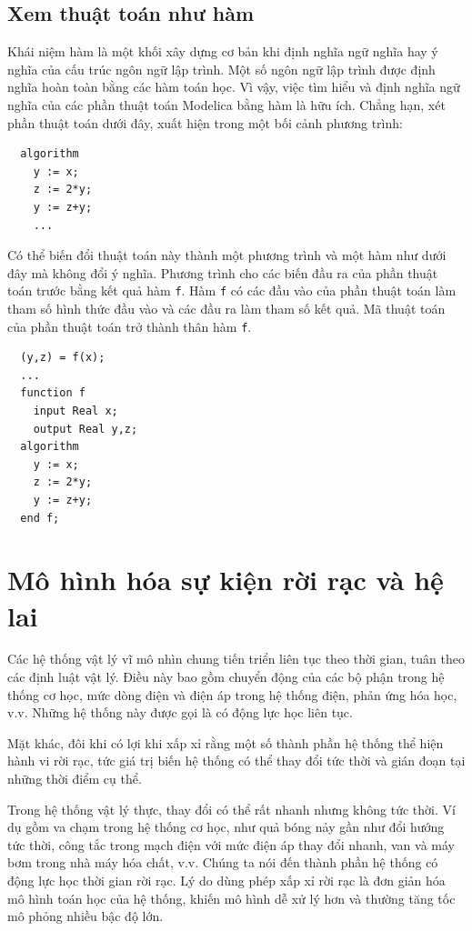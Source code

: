 \subsection{Xem thuật toán như hàm}
Khái niệm hàm là một khối xây dựng cơ bản khi định nghĩa ngữ nghĩa hay ý nghĩa của cấu trúc ngôn ngữ lập trình. Một số ngôn ngữ lập trình được định nghĩa hoàn toàn bằng các hàm toán học. Vì vậy, việc tìm hiểu và định nghĩa ngữ nghĩa của các phần thuật toán Modelica bằng hàm là hữu ích. Chẳng hạn, xét phần thuật toán dưới đây, xuất hiện trong một bối cảnh phương trình:
\begin{verbatim}
  algorithm
    y := x;
    z := 2*y;
    y := z+y;
    ...
\end{verbatim}
Có thể biến đổi thuật toán này thành một phương trình và một hàm như dưới đây mà không đổi ý nghĩa. Phương trình cho các biến đầu ra của phần thuật toán trước bằng kết quả hàm \texttt{f}. Hàm \texttt{f} có các đầu vào của phần thuật toán làm tham số hình thức đầu vào và các đầu ra làm tham số kết quả. Mã thuật toán của phần thuật toán trở thành thân hàm \texttt{f}.
\begin{verbatim}
  (y,z) = f(x);
  ...
  function f
    input Real x;
    output Real y,z;
  algorithm
    y := x;
    z := 2*y;
    y := z+y;
  end f;
\end{verbatim}

\section{Mô hình hóa sự kiện rời rạc và hệ lai}
Các hệ thống vật lý vĩ mô nhìn chung tiến triển liên tục theo thời gian, tuân theo các định luật vật lý. Điều này bao gồm chuyển động của các bộ phận trong hệ thống cơ học, mức dòng điện và điện áp trong hệ thống điện, phản ứng hóa học, v.v. Những hệ thống này được gọi là có động lực học liên tục.

Mặt khác, đôi khi có lợi khi xấp xỉ rằng một số thành phần hệ thống thể hiện hành vi rời rạc, tức giá trị biến hệ thống có thể thay đổi tức thời và gián đoạn tại những thời điểm cụ thể.

Trong hệ thống vật lý thực, thay đổi có thể rất nhanh nhưng không tức thời. Ví dụ gồm va chạm trong hệ thống cơ học, như quả bóng nảy gần như đổi hướng tức thời, công tắc trong mạch điện với mức điện áp thay đổi nhanh, van và máy bơm trong nhà máy hóa chất, v.v. Chúng ta nói đến thành phần hệ thống có động lực học thời gian rời rạc. Lý do dùng phép xấp xỉ rời rạc là đơn giản hóa mô hình toán học của hệ thống, khiến mô hình dễ xử lý hơn và thường tăng tốc mô phỏng nhiều bậc độ lớn.

